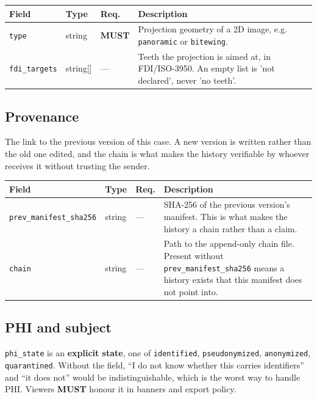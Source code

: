 \documentclass[11pt,a4paper]{article}
\newcommand{\MUST}{\textcolor{uosred}{\textbf{MUST}}}
\newcommand{\code}[1]{\texttt{\small #1}}
\begin{document}
\begin{longtable}{L{3.5cm} L{3.0cm} C{1.4cm} L{6.4cm}}
\toprule
\textbf{Field} & \textbf{Type} & \textbf{Req.} & \textbf{Description}\\
\midrule
\endhead
\code{type} & string & \MUST{} & Projection geometry of a 2D image, e.g. \code{panoramic} or \code{bitewing}.\\
\code{fdi\_targets} & string[] & --- & Teeth the projection is aimed at, in FDI/ISO-3950. An empty list is 'not declared', never 'no teeth'.\\
\bottomrule
\end{longtable}

\subsection{Provenance}

The link to the previous version of this case. A new version is written rather than the old one edited, and the chain is what makes the history verifiable by whoever receives it without trusting the sender.

\begin{longtable}{L{4.5cm} L{2.5cm} C{1.4cm} L{5.9cm}}
\toprule
\textbf{Field} & \textbf{Type} & \textbf{Req.} & \textbf{Description}\\
\midrule
\endhead
\code{prev\_manifest\_sha256} & string & --- & SHA-256 of the previous version's manifest. This is what makes the history a chain rather than a claim.\\
\code{chain} & string & --- & Path to the append-only chain file. Present without \code{prev\_manifest\_sha256} means a history exists that this manifest does not point into.\\
\bottomrule
\end{longtable}

\subsection{PHI and subject}\label{sec:phi}

\code{phi\_state} is an \textbf{explicit state}, one of \code{identified},
\code{pseudonymized}, \code{anonymized}, \code{quarantined}. Without the field, ``I do not
know whether this carries identifiers'' and ``it does not'' would be indistinguishable,
which is the worst way to handle PHI. Viewers \MUST{} honour it in banners and export
policy.
\end{document}
